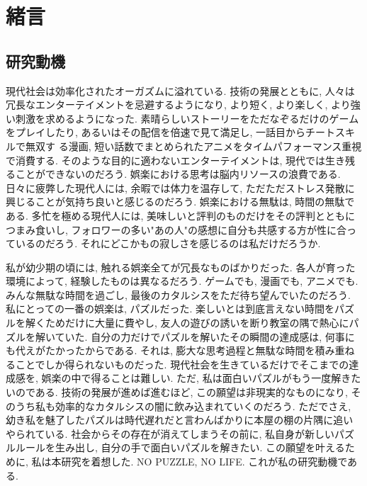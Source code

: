 \chapter{緒言}
\section{研究動機}\label{section:Motivation}
現代社会は効率化されたオーガズムに溢れている. 技術の発展とともに, 人々は冗長なエンターテイメントを忌避するようになり, より短く, より楽しく, より強い刺激を求めるようになった. 素晴らしいストーリーをただなぞるだけのゲームをプレイしたり, あるいはその配信を倍速で見て満足し, 一話目からチートスキルで無双す
る漫画, 短い話数でまとめられたアニメをタイムパフォーマンス重視で消費する. そのような目的に適わないエンターテイメントは, 現代では生き残ることができないのだろう. 娯楽における思考は脳内リソースの浪費である. 日々に疲弊した現代人には, 余暇では体力を温存して, ただただストレス発散に興じることが気持ち良いと感じるのだろう. 娯楽における無駄は, 時間の無駄である. 多忙を極める現代人には, 美味しいと評判のものだけをその評判とともにつまみ食いし, フォロワーの多い"あの人"の感想に自分も共感する方が性に合っているのだろう. それにどこかもの寂しさを感じるのは私だけだろうか.

私が幼少期の頃には, 触れる娯楽全てが冗長なものばかりだった. 各人が育った環境によって, 経験したものは異なるだろう. ゲームでも, 漫画でも, アニメでも. みんな無駄な時間を過ごし, 最後のカタルシスをただ待ち望んでいたのだろう.
私にとっての一番の娯楽は, パズルだった. 楽しいとは到底言えない時間をパズルを解くためだけに大量に費やし, 友人の遊びの誘いを断り教室の隅で熱心にパズルを解いていた. 自分の力だけでパズルを解いたその瞬間の達成感は, 何事にも代えがたかったからである. それは, 膨大な思考過程と無駄な時間を積み重ねることでしか得られないものだった. 現代社会を生きているだけでそこまでの達成感を, 娯楽の中で得ることは難しい. ただ, 私は面白いパズルがもう一度解きたいのである. 技術の発展が進めば進むほど, この願望は非現実的なものになり, そのうち私も効率的なカタルシスの闇に飲み込まれていくのだろう. ただでさえ, 幼き私を魅了したパズルは時代遅れだと言わんばかりに本屋の棚の片隅に追いやられている. 社会からその存在が消えてしまうその前に, 私自身が新しいパズルルールを生み出し, 自分の手で面白いパズルを解きたい. この願望を叶えるために, 私は本研究を着想した. NO PUZZLE, NO LIFE. これが私の研究動機である.

